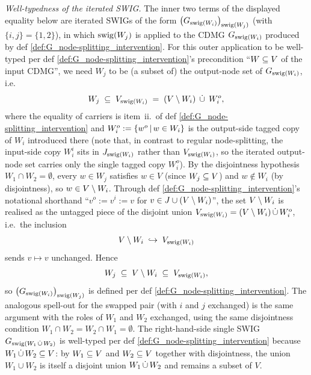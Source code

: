 \documentclass[main]{subfiles}
\begin{document}
\begin{Lem}
    \emph{Well-typedness of the iterated SWIG.}
    The inner two terms of the displayed equality below are iterated SWIGs of the form $\left ( G_{\mathrm{swig}(W_i)} \right )_{\mathrm{swig}(W_j)}$ (with $\{i, j\} = \{1, 2\}$), in which $\mathrm{swig}(W_j)$ is applied to the CDMG $G_{\mathrm{swig}(W_i)}$ produced by def \ref{def:G_node-splitting_intervention}. For this outer application to be well-typed per def \ref{def:G_node-splitting_intervention}'s precondition ``$W \subseteq V$ of the input CDMG'', we need $W_j$ to be (a subset of) the output-node set of $G_{\mathrm{swig}(W_i)}$, i.e.\
    \[ W_j \;\subseteq\; V_{\mathrm{swig}(W_i)} \;=\; (V \setminus W_i) \;\,\dot{\cup}\,\; W_i^o, \]
    where the equality of carriers is item~ii.\ of def \ref{def:G_node-splitting_intervention} and $W_i^o := \left \{ w^o \,\middle|\, w \in W_i \right \}$ is the output-side tagged copy of $W_i$ introduced there (note that, in contrast to regular node-splitting, the input-side copy $W_i^i$ sits in $J_{\mathrm{swig}(W_i)}$ rather than $V_{\mathrm{swig}(W_i)}$, so the iterated output-node set carries only the single tagged copy $W_i^o$). By the disjointness hypothesis $W_1 \cap W_2 = \emptyset$, every $w \in W_j$ satisfies $w \in V$ (since $W_j \subseteq V$) and $w \notin W_i$ (by disjointness), so $w \in V \setminus W_i$. Through def \ref{def:G_node-splitting_intervention}'s notational shorthand ``$v^o := v^i := v$ for $v \in J \cup (V \setminus W_i)$'', the set $V \setminus W_i$ is realised as the untagged piece of the disjoint union $V_{\mathrm{swig}(W_i)} = (V \setminus W_i) \,\dot{\cup}\, W_i^o$, i.e.\ the inclusion
    \[ V \setminus W_i \;\hookrightarrow\; V_{\mathrm{swig}(W_i)} \]
    sends $v \mapsto v$ unchanged. Hence
    \[ W_j \;\subseteq\; V \setminus W_i \;\subseteq\; V_{\mathrm{swig}(W_i)}, \]
    so $\left ( G_{\mathrm{swig}(W_i)} \right )_{\mathrm{swig}(W_j)}$ is defined per def \ref{def:G_node-splitting_intervention}. The analogous spell-out for the swapped pair (with $i$ and $j$ exchanged) is the same argument with the roles of $W_1$ and $W_2$ exchanged, using the same disjointness condition $W_1 \cap W_2 = W_2 \cap W_1 = \emptyset$. The right-hand-side single SWIG $G_{\mathrm{swig}(W_1 \,\dot{\cup}\, W_2)}$ is well-typed per def \ref{def:G_node-splitting_intervention} because $W_1 \,\dot{\cup}\, W_2 \subseteq V$: by $W_1 \subseteq V$ and $W_2 \subseteq V$ together with disjointness, the union $W_1 \cup W_2$ is itself a disjoint union $W_1 \,\dot{\cup}\, W_2$ and remains a subset of $V$.


\end{Lem}
\end{document}
